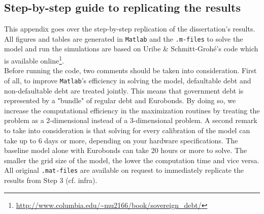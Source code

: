 \begin{appendices}
\chapter{Step-by-step guide to replicating the results}
This appendix goes over the step-by-step replication of the dissertation's results. All figures and tables are generated in \texttt{Matlab} and the \texttt{.m-files} to solve the model and run the simulations are based on Uribe \& Schmitt-Grohé's code which is available online\footnote{\url{http://www.columbia.edu/~mu2166/book/sovereign_debt/}}.\\

Before running the code, two comments should be taken into consideration. First of all, to improve \texttt{Matlab}'s efficiency in solving the model, defaultable debt and non-defaultable debt are treated jointly. This means that government debt is represented by a "bundle" of regular debt and Eurobonds. By doing so, we increase the computational efficiency in the maximization routines by treating the problem as a 2-dimensional instead of a 3-dimensional problem. A second remark to take into consideration is that solving for every calibration of the model can take up to 6 days or more, depending on your hardware specifications. The baseline model alone with Eurobonds can take 20 hours or more to solve. The smaller the grid size of the model, the lower the computation time and vice versa. All original \texttt{.mat-files} are available on request to immediately replicate the results from Step 3 (cf. infra).\\


\end{appendices}
